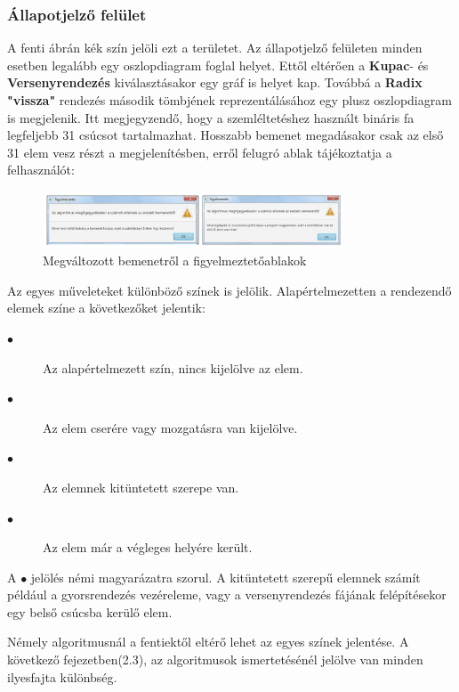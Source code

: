 \documentclass{elteikthesis}
\begin{document}
\subsubsection{Állapotjelző felület}
A fenti ábrán kék szín jelöli ezt a területet.
Az állapotjelző felületen minden esetben legalább egy oszlopdiagram foglal helyet. Ettől eltérően a \textbf{Kupac}- és \textbf{Versenyrendezés} kiválasztásakor egy gráf is helyet kap. Továbbá a \textbf{Radix "vissza"} rendezés második tömbjének reprezentálásához egy plusz oszlopdiagram is megjelenik. Itt megjegyzendő, hogy a szemléltetéshez használt bináris fa legfeljebb 31 csúcsot tartalmazhat. Hosszabb bemenet megadásakor csak az első 31 elem vesz részt a megjelenítésben, erről felugró ablak tájékoztatja a felhasználót:
 \begin{figure}[H]
 	\centering
 	\includegraphics[width=0.8\textwidth]{pics/splittedinput.jpg}
 	\caption{Megváltozott bemenetről a figyelmeztetőablakok}
 \end{figure}

\par Az egyes műveleteket különböző színek is jelölik. Alapértelmezetten a rendezendő elemek színe a következőket jelentik:\par
\begin{description}
	\item[\textcolor{default}{\Huge$\bullet$}] Az alapértelmezett szín, nincs kijelölve az elem.
	\item[\textcolor{swap}{\Huge$\bullet$}] Az elem cserére vagy mozgatásra van kijelölve.
	\item[\textcolor{select}{\Huge$\bullet$}] Az elemnek kitüntetett szerepe van.
	\item[\textcolor{done}{\Huge$\bullet$}] Az elem már a végleges helyére került.
\end{description}
A \textcolor{select}{\Huge$\bullet$} jelölés némi magyarázatra szorul. A kitüntetett szerepű elemnek számít például a gyorsrendezés vezéreleme, vagy a versenyrendezés fájának felépítésekor egy belső csúcsba kerülő elem.\par
Némely algoritmusnál a fentiektől eltérő lehet az egyes színek jelentése. A következő fejezetben(2.3), az algoritmusok ismertetésénél jelölve van minden ilyesfajta különbség.
\end{document}
